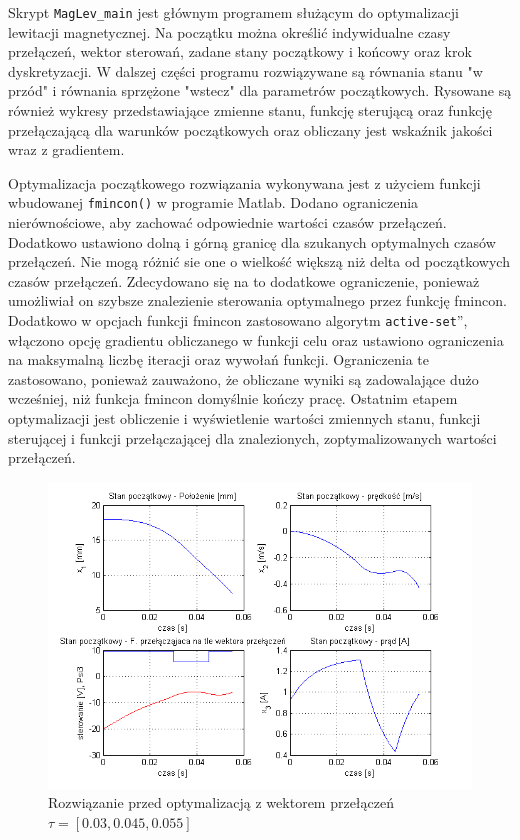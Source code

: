 Skrypt \texttt{MagLev\_main} jest głównym programem służącym do optymalizacji lewitacji magnetycznej. Na początku
można określić indywidualne czasy przełączeń, wektor sterowań, zadane stany początkowy i końcowy oraz
krok dyskretyzacji. W dalszej części programu rozwiązywane są równania stanu "w przód" i równania
sprzężone "wstecz" dla parametrów początkowych. Rysowane są również wykresy przedstawiające zmienne stanu, 
funkcję sterującą oraz funkcję przełączającą dla warunków początkowych oraz obliczany jest wskaźnik jakości
wraz z gradientem.

Optymalizacja początkowego rozwiązania wykonywana jest z użyciem funkcji wbudowanej 
\texttt{fmincon()} w programie Matlab. Dodano ograniczenia nierównościowe, aby zachować odpowiednie wartości czasów
przełączeń. Dodatkowo ustawiono dolną i górną granicę dla szukanych optymalnych czasów przełączeń. Nie 
mogą różnić sie one o wielkość większą niż delta od początkowych czasów przełączeń. Zdecydowano się na to
dodatkowe ograniczenie, ponieważ umożliwiał on szybsze znalezienie sterowania optymalnego przez funkcję
fmincon. Dodatkowo w opcjach funkcji fmincon zastosowano algorytm \quotedblbase \texttt{active-set}\textquotedblright, włączono opcję gradientu
obliczanego w funkcji celu oraz ustawiono ograniczenia na maksymalną liczbę iteracji oraz wywołań funkcji.
Ograniczenia te zastosowano, ponieważ zauważono, że obliczane wyniki są zadowalające dużo wcześniej, niż
funkcja fmincon domyślnie kończy pracę. Ostatnim etapem optymalizacji jest obliczenie i wyświetlenie 
wartości zmiennych stanu, funkcji sterującej i funkcji przełączającej dla znalezionych, zoptymalizowanych
wartości przełączeń. 

\begin{figure}[!htb]
\centering
\includegraphics[scale=1]{img/start3.png}
\caption{Rozwiązanie przed optymalizacją z wektorem przełączeń $\tau = [0.03, 0.045, 0.055]$}
\label{rys:start1}
\end{figure}


